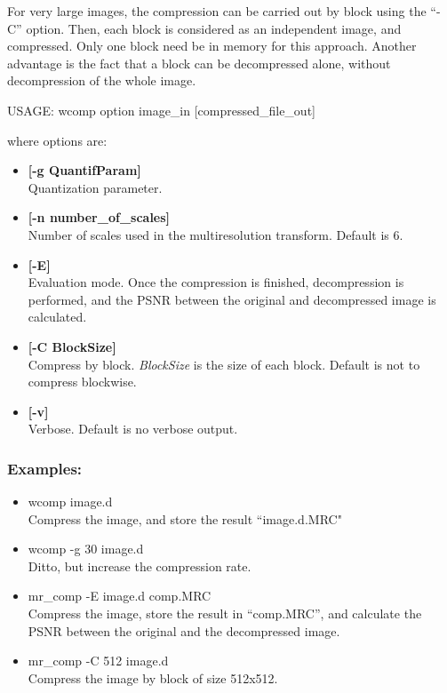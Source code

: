 For very large images, the compression can be carried out by block 
using the ``-C'' 
option.  Then, each block is considered as an independent image, and 
compressed. Only one block need be in memory for this approach. Another
advantage is the fact that a block can be decompressed alone, without
decompression of the whole image.
{\bf
\begin{center}
 USAGE: wcomp option image\_in [compressed\_file\_out]
\end{center}}
where options are:
\begin{itemize}     
\baselineskip=0.4truecm 
\item {\bf [-g QuantifParam]}  \\
 Quantization parameter.
\item {\bf [-n number\_of\_scales]}  \\
Number of scales used in the multiresolution transform. Default is 6.
\item {\bf [-E]} \\
 Evaluation mode. Once the compression is finished, 
 decompression is performed, and the PSNR between the
 original and decompressed image is calculated.
\item {\bf [-C BlockSize] } \\
Compress by block. {\em BlockSize} is the size of each block.
Default is not to compress blockwise.
\item {\bf [-v]} \\
Verbose. Default is no verbose output.
\end{itemize}
\subsubsection*{Examples:}
\begin{itemize}
\item wcomp image.d \\
Compress the image, and store the result ``image.d.MRC"
\item wcomp -g 30 image.d \\
Ditto, but increase the compression rate.
\item mr\_comp -E image.d comp.MRC\\
Compress the image, store the result in ``comp.MRC'', and calculate 
the PSNR between the original and the decompressed image.
\item mr\_comp -C 512 image.d \\
Compress the image by block of size 512x512.
\end{itemize}

